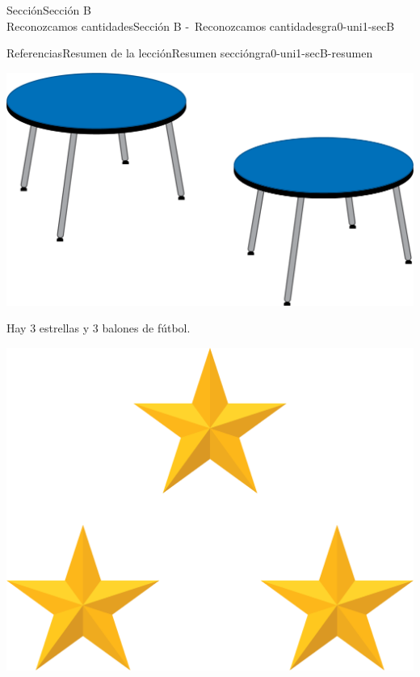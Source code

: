 \begin{sectionptx}{Sección}{{\Large Sección B\\}Reconozcamos cantidades}{}{Sección B -~Reconozcamos cantidades}{}{}{gra0-uni1-secB}
\begin{references-subsection}{Referencias}{Resumen de la lección}{}{Resumen sección}{}{}{gra0-uni1-secB-resumen}
\begin{sidebyside}{2}{0.025}{0.025}{0.05}
\begin{sbspanel}{0.5}
\end{sbspanel}%
\begin{sbspanel}{0.4}%
\includegraphics[max width=\linewidth, center]{external/png-source/2-tables.png}
\end{sbspanel}%
\end{sidebyside}%
\par
Hay 3 estrellas y 3 balones de fútbol.%
\begin{sidebyside}{2}{0.1}{0.1}{0.2}%
\begin{sbspanel}{0.3}%
\includegraphics[max width=\linewidth, center]{external/png-source/K.1.C11.BLM.F.png}
\end{sbspanel}%
\begin{sbspanel}{0.3}%

\end{sbspanel}
\end{sidebyside}
\end{references-subsection}
\end{sectionptx}
